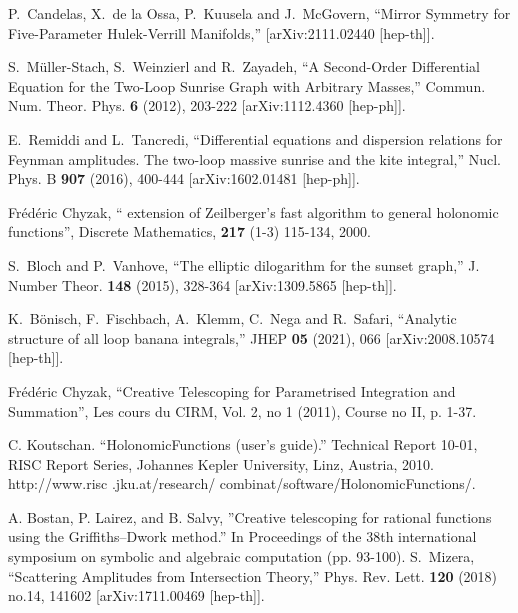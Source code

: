 \documentclass[a4paper,12pt]{article}
\numberwithin{equation}{section}
\numberwithin{figure}{subsection}
\theoremstyle{plain}
\theoremstyle{plain}
\theoremstyle{definition}
\theoremstyle{plain}
\theoremstyle{remark}
\theoremstyle{plain}
\begin{document}
\begin{thebibliography}{99}
P.~Candelas, X.~de la Ossa, P.~Kuusela and J.~McGovern,
``Mirror Symmetry for Five-Parameter Hulek-Verrill Manifolds,''
[arXiv:2111.02440 [hep-th]].

S.~M\"uller-Stach, S.~Weinzierl and R.~Zayadeh,
``A Second-Order Differential Equation for the Two-Loop Sunrise Graph with Arbitrary Masses,''
Commun. Num. Theor. Phys. \textbf{6} (2012), 203-222
[arXiv:1112.4360 [hep-ph]].

E.~Remiddi and L.~Tancredi,
``Differential equations and dispersion relations for Feynman amplitudes. The two-loop massive sunrise and the kite integral,''
Nucl. Phys. B \textbf{907} (2016), 400-444
[arXiv:1602.01481 [hep-ph]].

  Fr\'ed\'eric Chyzak, `` extension of
    Zeilberger's fast algorithm to general holonomic functions'',
Discrete Mathematics, {\bf 217} (1-3) 115-134, 2000.

S.~Bloch and P.~Vanhove,
``The elliptic dilogarithm for the sunset graph,''
J. Number Theor. \textbf{148} (2015), 328-364
[arXiv:1309.5865 [hep-th]].

K.~B\"onisch, F.~Fischbach, A.~Klemm, C.~Nega and R.~Safari,
``Analytic structure of all loop banana integrals,''
JHEP \textbf{05} (2021), 066
[arXiv:2008.10574 [hep-th]].

 Fr\'ed\'eric Chyzak, ``Creative Telescoping for
  Parametrised Integration and Summation'',  Les cours du CIRM,  Vol. 2, no 1 (2011), Course no II, p. 1-37.


 C. Koutschan. ``HolonomicFunctions (user's guide).'' Technical Report 10-01, RISC Report Series, Johannes Kepler University, Linz, Austria, 2010. http://www.risc
.jku.at/research/ combinat/software/HolonomicFunctions/.

 A. Bostan, P. Lairez, and B. Salvy,
  ''Creative telescoping for rational functions using the
  Griffiths--Dwork method.'' In Proceedings of the 38th international
  symposium on symbolic and algebraic computation (pp. 93-100). 
S.~Mizera,
``Scattering Amplitudes from Intersection Theory,''
Phys. Rev. Lett. \textbf{120} (2018) no.14, 141602
[arXiv:1711.00469 [hep-th]].


\end{thebibliography}
\end{document}
